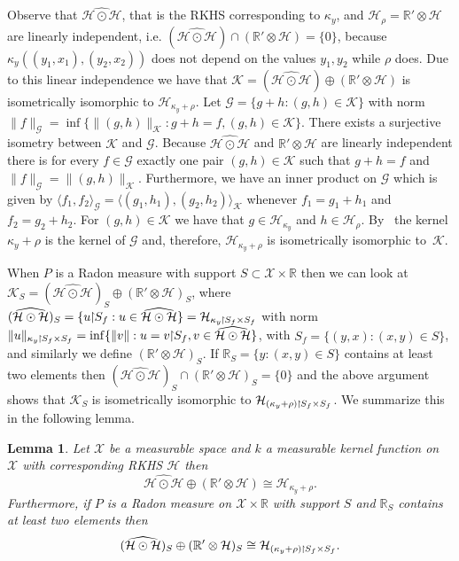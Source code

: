 \documentclass[10pt]{amsart}
\newtheorem{lemm}[theo]{Lemma}\newtheorem{prop}[theo]{Proposition}\newtheorem{coro}[theo]{Corollary}\newtheorem{conj}[theo]{Conjecture}
\theoremstyle{definition}\newtheorem{defi}[theo]{Definition}\newtheorem{rema}[theo]{Remark}\newtheorem{exam}[theo]{Example}\newtheorem{exem}[theo]{Example}\newtheorem{nota}[theo]{Notation}
\theoremstyle{remark}
\newcommand{\restrr}
{\!\!\upharpoonright\!\!}
\newcommand{\R}{\mathbb{R}}
\newcommand{\dR}{{\R'}}
\newcommand{\X}{\mathcal{X}}
\newcommand{\cH}{\mathcal{H}}
\newcommand{\clK}{\mathcal{K}}
\newcommand{\clG}{\mathcal{G}}
\newcommand*{\mk}{\mkern -1mu}
\begin{document}
Observe that $\widehat{\cH \odot \cH}$, that is the RKHS corresponding to $\kappa_y$, and $\cH_\rho = \dR \otimes \cH$ are linearly independent, i.e. $(\widehat{\cH\odot \cH}) \cap (\dR \otimes \cH) = \{0\}$, because $\kappa_y((y_1,x_1),(y_2,x_2))$ does not depend on the values $y_1,y_2$ while $\rho$ does. Due to this linear independence we have that $\clK = (\widehat{\cH \odot \cH}) \oplus (\dR \otimes \cH)$ is isometrically isomorphic to $\cH_{\kappa_y + \rho}$. Let $\clG = \{g + h : (g,h) \in \clK \}$ with norm $\|f \|_\clG = \inf \{\|(g,h)\|_{\clK} : g+ h = f, (g,h) \in \clK \}$. There exists a surjective isometry between $\clK$ and $\clG$. Because $\widehat{\cH \odot \cH}$ and $\dR \otimes \cH$ are linearly independent there is for every $ f\in \clG$ exactly one pair $(g,h) \in \clK$ such that $g + h = f$ and $\|f\|_\clG = \|(g,h)\|_\clK$. Furthermore, we have an inner product on $\clG$ which is given by $\langle f_1, f_2 \rangle_\clG = \langle (g_1,h_1), (g_2,h_2) \rangle_\clK$ whenever $f_1 = g_1 + h_1$ and $f_2 = g_2 + h_2$. For $(g,h) \in \clK$ we have that $g\in \cH_{\kappa_y}$ and $h \in \cH_{\rho}$. By~\cite[Theorem, p.~353]{ARON50} the kernel $\kappa_y + \rho$ is the kernel of $\clG$ and, therefore, $\cH_{\kappa_y + \rho}$ is isometrically isomorphic to~$\clK$.

When $P$ is a Radon measure with support $S \subset \X \times \R$ then we can look at $\clK_S = (\widehat{\cH \odot \cH})_S \oplus (\R' \otimes \cH)_S$, where $(\widehat{\cH \odot \cH})_S = \{u \restrr S_f : u\in \widehat{\cH \odot \cH}\}= \cH_{\kappa_y\mk\upharpoonright\mk S_f \times S_f} $ with norm $\|u\|_{\kappa_y\mk\upharpoonright\mk S_f \times S_f} = \inf \{ \|v\| : u = v \restrr S_f, v \in \widehat{\cH \odot \cH} \}$, with $S_f = \{(y,x) : (x,y) \in S\}$, and similarly we define $(\R' \otimes \cH)_S$. If $\R_S = \{y : (x,y) \in S \}$ contains at least two elements then $(\widehat{\cH \odot \cH})_S \cap (\R' \otimes \cH)_S = \{0\}$ and the above argument shows that $\clK_S$ is isometrically isomorphic to $\cH_{(\kappa_y + \rho)\mk\upharpoonright\mk S_f \times S_f}$. We summarize this in the following lemma.

\begin{lemm}\label{lem:iso_iso_simult}
Let $\X$ be a measurable space and $k$ a measurable kernel function on $\X$ with corresponding RKHS $\cH$ then
\[
\widehat{\cH \odot \cH}\oplus (\dR \otimes \cH) \cong \cH_{\kappa_y + \rho}.
\]
Furthermore, if $P$ is a Radon measure on $\X \times \R$ with support $S$ and $\R_S$ contains at least two elements then
\[
(\widehat{\cH \odot \cH})_S \oplus (\R' \otimes \cH)_S \cong \cH_{(\kappa_y + \rho)\mk\upharpoonright\mk S_f \times S_f}.
\]
\end{lemm}
\end{document}
